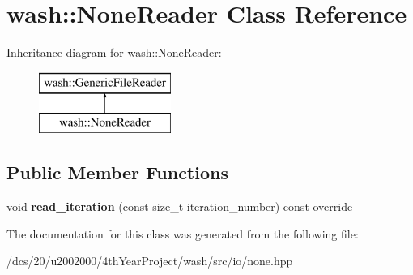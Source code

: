 \hypertarget{classwash_1_1NoneReader}{}\section{wash\+:\+:None\+Reader Class Reference}
\label{classwash_1_1NoneReader}
Inheritance diagram for wash\+:\+:None\+Reader\+:\begin{figure}[H]
\begin{center}
\leavevmode
\includegraphics[height=2.000000cm]{classwash_1_1NoneReader}
\end{center}
\end{figure}
\subsection*{Public Member Functions}
\begin{DoxyCompactItemize}
\item 
\mbox{\label{classwash_1_1NoneReader_aaaa9a5d1fe678c4feea3b33c1b14db4b}} 
void {\bfseries read\+\_\+iteration} (const size\+\_\+t iteration\+\_\+number) const override
\end{DoxyCompactItemize}


The documentation for this class was generated from the following file\+:\begin{DoxyCompactItemize}
\item 
/dcs/20/u2002000/4th\+Year\+Project/wash/src/io/none.\+hpp\end{DoxyCompactItemize}
